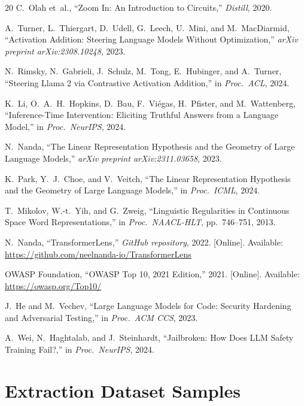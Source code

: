 \documentclass[journal, onecolumn]{IEEEtran}
\begin{document}
\begin{thebibliography}{20}
C.~Olah et~al., ``Zoom In: An Introduction to Circuits,'' \textit{Distill}, 2020.

A.~Turner, L.~Thiergart, D.~Udell, G.~Leech, U.~Mini, and M.~MacDiarmid, ``Activation Addition: Steering Language Models Without Optimization,'' \textit{arXiv preprint arXiv:2308.10248}, 2023.

N.~Rimsky, N.~Gabrieli, J.~Schulz, M.~Tong, E.~Hubinger, and A.~Turner, ``Steering Llama 2 via Contrastive Activation Addition,'' in \textit{Proc.\ ACL}, 2024.

K.~Li, O.~A.~H.~Hopkins, D.~Bau, F.~Viégas, H.~Pfister, and M.~Wattenberg, ``Inference-Time Intervention: Eliciting Truthful Answers from a Language Model,'' in \textit{Proc.\ NeurIPS}, 2024.

N.~Nanda, ``The Linear Representation Hypothesis and the Geometry of Large Language Models,'' \textit{arXiv preprint arXiv:2311.03658}, 2023.

K.~Park, Y.~J.~Choe, and V.~Veitch, ``The Linear Representation Hypothesis and the Geometry of Large Language Models,'' in \textit{Proc.\ ICML}, 2024.

T.~Mikolov, W.-t.~Yih, and G.~Zweig, ``Linguistic Regularities in Continuous Space Word Representations,'' in \textit{Proc.\ NAACL-HLT}, pp.~746--751, 2013.

N.~Nanda, ``TransformerLens,'' \textit{GitHub repository}, 2022. [Online]. Available: \url{https://github.com/neelnanda-io/TransformerLens}

OWASP Foundation, ``OWASP Top 10, 2021 Edition,'' 2021. [Online]. Available: \url{https://owasp.org/Top10/}

J.~He and M.~Vechev, ``Large Language Models for Code: Security Hardening and Adversarial Testing,'' in \textit{Proc.\ ACM CCS}, 2023.

A.~Wei, N.~Haghtalab, and J.~Steinhardt, ``Jailbroken: How Does LLM Safety Training Fail?,'' in \textit{Proc.\ NeurIPS}, 2024.

\end{thebibliography}

\newpage
\appendix

\section{Extraction Dataset Samples}
\label{app:extraction}
\end{document}
